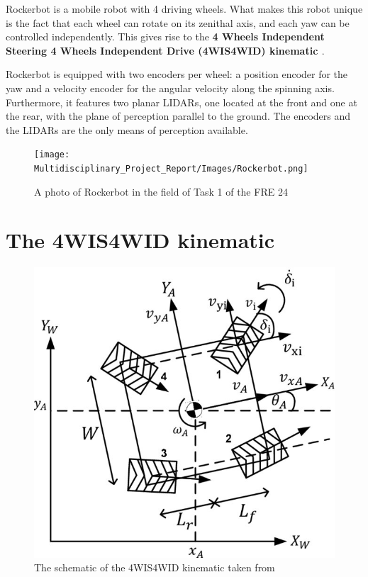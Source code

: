 \documentclass[11pt,a4paper,twocolumn]{article}
\begin{document}
Rockerbot is a mobile robot with 4 driving wheels. What makes this robot unique is the fact that each wheel can rotate on its zenithal axis, and each yaw can be controlled independently. This gives rise to the \textbf{4 Wheels Independent Steering 4 Wheels Independent Drive (4WIS4WID) kinematic \cite{4WIS4WID}}.

Rockerbot is equipped with two encoders per wheel: a position encoder for the yaw and a velocity encoder for the angular velocity along the spinning axis. Furthermore, it features two planar LIDARs, one located at the front and one at the rear, with the plane of perception parallel to the ground. The encoders and the LIDARs are the only means of perception available.

\begin{figure}
    \centering
    \texttt{[image: Multidisciplinary\_Project\_Report/Images/Rockerbot.png]}
    \caption{A photo of Rockerbot in the field of Task 1 of the FRE 24}
    \label{fig:rockerbot}
\end{figure}

\section{The 4WIS4WID kinematic}

\begin{figure}
    \centering
    \includegraphics[width=1\linewidth]{Multidisciplinary_Project_Report/Images/4WISskematic.png}
    \caption{The schematic of the 4WIS4WID kinematic taken from \cite{4WISschematic}}
    \label{fig:4WIS}
\end{figure}
\end{document}
